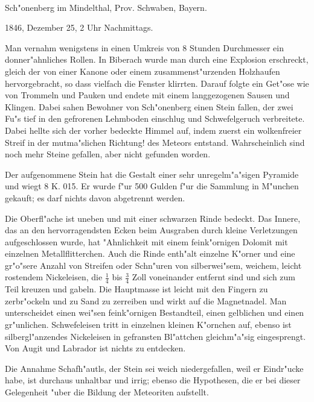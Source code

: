 \documentclass[a4paper, 11pt, oneside]{article}
\begin{document}
\paragraph{}
Sch"onenberg im Mindelthal, Prov. Schwaben, Bayern.

1846, Dezember 25, 2 Uhr Nachmittags.

Man vernahm wenigstens in einen Umkreis von 8 Stunden Durchmesser ein donner"ahnliches Rollen. In Biberach wurde man durch eine Explosion erschreckt, gleich der von einer Kanone oder einem zusammenst"urzenden Holzhaufen hervorgebracht, so dass vielfach die Fenster klirrten. Darauf folgte ein Get"ose wie von Trommeln und Pauken und endete mit einem langgezogenen Sausen und Klingen. Dabei sahen Bewohner von Sch"onenberg einen Stein fallen, der zwei Fu"s tief in den gefrorenen Lehmboden einschlug und Schwefelgeruch verbreitete. Dabei hellte sich der vorher bedeckte Himmel auf, indem zuerst ein wolkenfreier Streif in der mutma"slichen Richtung! des Meteors entstand. Wahrscheinlich sind noch mehr Steine gefallen, aber nicht gefunden worden.

Der aufgenommene Stein hat die Gestalt einer sehr unregelm"a"sigen Pyramide und wiegt 8 K. 015. Er wurde f"ur 500 Gulden f"ur die Sammlung in M"unchen gekauft; es darf nichts davon abgetrennt werden.

Die Oberfl"ache ist uneben und mit einer schwarzen Rinde bedeckt. Das Innere, das an den hervorragendsten Ecken beim Ausgraben durch kleine Verletzungen aufgeschlossen wurde, hat "Ahnlichkeit mit einem feink"ornigen Dolomit mit einzelnen Metallflitterchen. Auch die Rinde enth"alt einzelne K"orner und eine gr"o"sere Anzahl von Streifen oder Schn"uren von silberwei"sem, weichem, leicht rostendem Nickeleisen, die $\mathfrak{\frac{1}{4}}$ bis $\mathfrak{\frac{3}{4}}$ Zoll voneinander entfernt sind und sich zum Teil kreuzen und gabeln. Die Hauptmasse ist leicht mit den Fingern zu zerbr"ockeln und zu Sand zu zerreiben und wirkt auf die Magnetnadel. Man unterscheidet einen wei"sen feink"ornigen Bestandteil, einen gelblichen und einen gr"unlichen. Schwefeleisen tritt in einzelnen kleinen K"ornchen auf, ebenso ist silbergl"anzendes Nickeleisen in gefransten Bl"attchen gleichm"a"sig eingesprengt. Von Augit und Labrador ist nichts zu entdecken.

Die Annahme Schafh"autls, der Stein sei weich niedergefallen, weil er Eindr"ucke habe, ist durchaus unhaltbar und irrig; ebenso die Hypothesen, die er bei dieser Gelegenheit "uber die Bildung der Meteoriten aufstellt.
\end{document}
